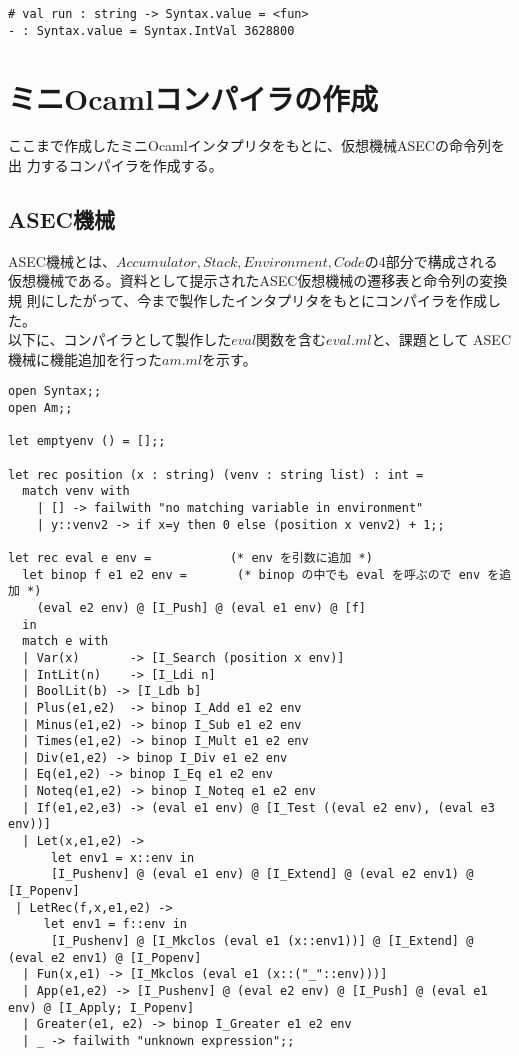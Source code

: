 \documentclass[a4paper,9pt]{jsarticle}
\begin{document}
\begin{lstlisting}
# val run : string -> Syntax.value = <fun>
- : Syntax.value = Syntax.IntVal 3628800
\end{lstlisting}
\section{ミニOcamlコンパイラの作成}
ここまで作成したミニOcamlインタプリタをもとに、仮想機械ASECの命令列を出
力するコンパイラを作成する。

\subsection{ASEC機械}
ASEC機械とは、$Accumulator, Stack, Environment, Code$の4部分で構成される
仮想機械である。資料として提示されたASEC仮想機械の遷移表と命令列の変換規
則にしたがって、今まで製作したインタプリタをもとにコンパイラを作成した。
\\

以下に、コンパイラとして製作した$eval$関数を含む$eval.ml$と、課題として
ASEC機械に機能追加を行った$am.ml$を示す。

\begin{lstlisting}[caption=eval.ml]
open Syntax;;
open Am;;

let emptyenv () = [];;

let rec position (x : string) (venv : string list) : int =
  match venv with
    | [] -> failwith "no matching variable in environment"
    | y::venv2 -> if x=y then 0 else (position x venv2) + 1;;

let rec eval e env =           (* env を引数に追加 *)
  let binop f e1 e2 env =       (* binop の中でも eval を呼ぶので env を追加 *)
    (eval e2 env) @ [I_Push] @ (eval e1 env) @ [f]
  in
  match e with
  | Var(x)       -> [I_Search (position x env)]
  | IntLit(n)    -> [I_Ldi n]
  | BoolLit(b) -> [I_Ldb b]
  | Plus(e1,e2)  -> binop I_Add e1 e2 env
  | Minus(e1,e2) -> binop I_Sub e1 e2 env
  | Times(e1,e2) -> binop I_Mult e1 e2 env
  | Div(e1,e2) -> binop I_Div e1 e2 env
  | Eq(e1,e2) -> binop I_Eq e1 e2 env
  | Noteq(e1,e2) -> binop I_Noteq e1 e2 env
  | If(e1,e2,e3) -> (eval e1 env) @ [I_Test ((eval e2 env), (eval e3 env))]
  | Let(x,e1,e2) -> 
      let env1 = x::env in
      [I_Pushenv] @ (eval e1 env) @ [I_Extend] @ (eval e2 env1) @ [I_Popenv]      
 | LetRec(f,x,e1,e2) -> 
     let env1 = f::env in
      [I_Pushenv] @ [I_Mkclos (eval e1 (x::env1))] @ [I_Extend] @ (eval e2 env1) @ [I_Popenv]
  | Fun(x,e1) -> [I_Mkclos (eval e1 (x::("_"::env)))]
  | App(e1,e2) -> [I_Pushenv] @ (eval e2 env) @ [I_Push] @ (eval e1 env) @ [I_Apply; I_Popenv] 
  | Greater(e1, e2) -> binop I_Greater e1 e2 env
  | _ -> failwith "unknown expression";;
\end{lstlisting}
\end{document}
